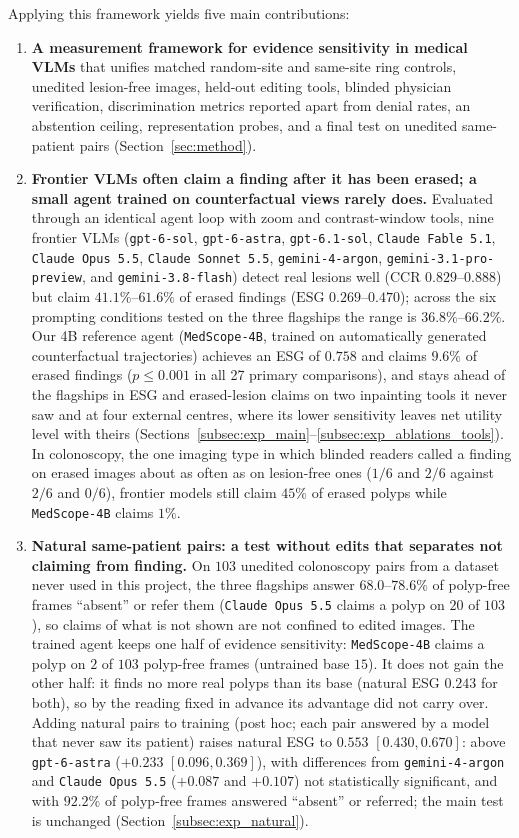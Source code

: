 \documentclass[5p,times,twocolumn,authoryear]{elsarticle}
\begin{document}
Applying this framework yields five main contributions:
\begin{enumerate}[leftmargin=*,nosep]
    \item \textbf{A measurement framework for evidence sensitivity in medical VLMs} that unifies matched random-site and same-site ring controls, unedited lesion-free images, held-out editing tools, blinded physician verification, discrimination metrics reported apart from denial rates, an abstention ceiling, representation probes, and a final test on unedited same-patient pairs (Section~\ref{sec:method}).
    \item \textbf{Frontier VLMs often claim a finding after it has been erased; a small agent trained on counterfactual views rarely does.} Evaluated through an identical agent loop with zoom and contrast-window tools, nine frontier VLMs (\texttt{gpt-6-sol}, \texttt{gpt-6-astra}, \texttt{gpt-6.1-sol}, \texttt{Claude Fable 5.1}, \texttt{Claude Opus 5.5}, \texttt{Claude Sonnet 5.5}, \texttt{gemini-4-argon}, \texttt{gemini-3.1-pro-preview}, and \texttt{gemini-3.8-flash}) detect real lesions well ($\text{CCR } 0.829\text{--}0.888$) but claim $41.1\%\text{--}61.6\%$ of erased findings ($\text{ESG } 0.269\text{--}0.470$); across the six prompting conditions tested on the three flagships the range is $36.8\%\text{--}66.2\%$. Our 4B reference agent (\texttt{MedScope-4B}, trained on automatically generated counterfactual trajectories) achieves an ESG of $0.758$ and claims $9.6\%$ of erased findings ($p \le 0.001$ in all 27 primary comparisons), and stays ahead of the flagships in ESG and erased-lesion claims on two inpainting tools it never saw and at four external centres, where its lower sensitivity leaves net utility level with theirs (Sections~\ref{subsec:exp_main}--\ref{subsec:exp_ablations_tools}). In colonoscopy, the one imaging type in which blinded readers called a finding on erased images about as often as on lesion-free ones ($1/6$ and $2/6$ against $2/6$ and $0/6$), frontier models still claim $45\%$ of erased polyps while \texttt{MedScope-4B} claims $1\%$.
    \item \textbf{Natural same-patient pairs: a test without edits that separates not claiming from finding.} On $103$ unedited colonoscopy pairs from a dataset never used in this project, the three flagships answer $68.0$--$78.6\%$ of polyp-free frames ``absent'' or refer them (\texttt{Claude Opus 5.5} claims a polyp on $20$ of $103$), so claims of what is not shown are not confined to edited images. The trained agent keeps one half of evidence sensitivity: \texttt{MedScope-4B} claims a polyp on $2$ of $103$ polyp-free frames (untrained base $15$). It does not gain the other half: it finds no more real polyps than its base (natural ESG $0.243$ for both), so by the reading fixed in advance its advantage did not carry over. Adding natural pairs to training (post hoc; each pair answered by a model that never saw its patient) raises natural ESG to $0.553$ $[0.430, 0.670]$: above \texttt{gpt-6-astra} ($+0.233$ $[0.096, 0.369]$), with differences from \texttt{gemini-4-argon} and \texttt{Claude Opus 5.5} ($+0.087$ and $+0.107$) not statistically significant, and with $92.2\%$ of polyp-free frames answered ``absent'' or referred; the main test is unchanged (Section~\ref{subsec:exp_natural}).

\end{enumerate}
\end{document}
